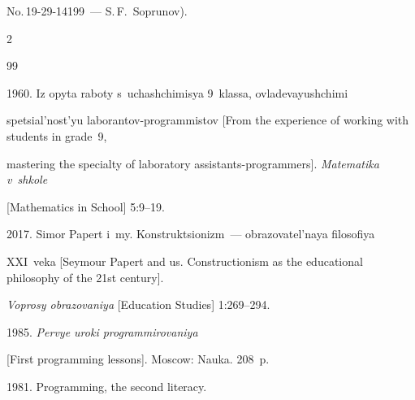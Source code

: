 No.\,19-29-14199~--- S.\,F.~Soprunov).










  \begin{multicols}{2}





\renewcommand{\bibname}{\protect\rmfamily References}







{\small\frenchspacing


 {%




 \begin{thebibliography}{99}







 1960. Iz opyta raboty s~uchashchimisya 9~klassa, ovladevayushchimi 


spetsial'nost'yu laborantov-programmistov [From the experience of working with students in grade~9, 


mastering the specialty of laboratory assistants-programmers]. \textit{Matematika v~shkole} 


[Mathematics in School] 5:9--19.




 2017. Simor Papert i~my. Konstruk\-tsio\-nizm~--- obrazovatel'naya filosofiya 


XXI~veka [Seymour Papert and us. Constructionism as the educational philosophy of the 21st century]. 


\textit{Voprosy obrazovaniya} [Education Studies] 1:269--294. 




 1985. \textit{Pervye uroki programmirovaniya} 


[First programming lessons]. Moscow: Nauka. 208~p.




 1981. Programming, the second literacy. 



\end{thebibliography}}}
\end{multicols}
